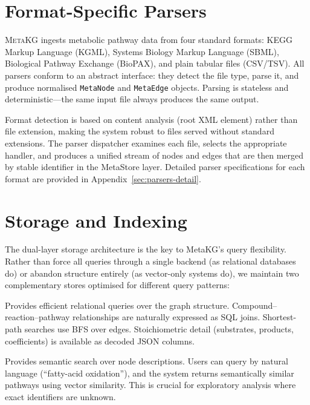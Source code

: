 \documentclass[10pt]{article}
\begin{document}
\section{Format-Specific Parsers}
\label{sec:parsers}

\textsc{MetaKG} ingests metabolic pathway data from four standard formats:
KEGG Markup Language (KGML), Systems Biology Markup Language (SBML), Biological
Pathway Exchange (BioPAX), and plain tabular files (CSV/TSV). All parsers
conform to an abstract interface: they detect the file type, parse it, and
produce normalised \texttt{MetaNode} and \texttt{MetaEdge} objects. Parsing
is stateless and deterministic---the same input file always produces the same
output.

Format detection is based on content analysis (root XML element) rather than
file extension, making the system robust to files served without standard
extensions. The parser dispatcher examines each file, selects the appropriate
handler, and produces a unified stream of nodes and edges that are then
merged by stable identifier in the MetaStore layer. Detailed parser
specifications for each format are provided in Appendix~\ref{sec:parsers-detail}.

\section{Storage and Indexing}
\label{sec:storage}

The dual-layer storage architecture is the key to MetaKG's query flexibility.
Rather than force all queries through a single backend (as relational databases
do) or abandon structure entirely (as vector-only systems do), we maintain two
complementary stores optimised for different query patterns:

\begin{description}[leftmargin=*,itemsep=3pt]
\item[SQLite] Provides efficient relational queries over the graph structure.
  Compound--reaction--pathway relationships are naturally expressed as SQL joins.
  Shortest-path searches use BFS over edges. Stoichiometric detail (substrates,
  products, coefficients) is available as decoded JSON columns.

\item[LanceDB + embeddings] Provides semantic search over node descriptions.
  Users can query by natural language (``fatty-acid oxidation''), and the system
  returns semantically similar pathways using vector similarity. This is crucial
  for exploratory analysis where exact identifiers are unknown.
\end{description}
\end{document}
